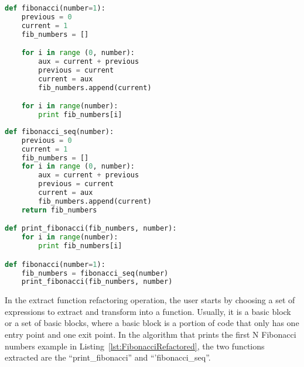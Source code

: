 



\begin{lstlisting}[frame=single, caption=Algorithm first implementation, label={lst:Fibonacci}, language=Python]
def fibonacci(number=1):
	previous = 0
	current = 1
	fib_numbers = []

	for i in range (0, number):
		aux = current + previous
		previous = current
		current = aux
		fib_numbers.append(current)

	for i in range(number):
		print fib_numbers[i]
\end{lstlisting}


\begin{lstlisting}[frame=single, caption=Algorithm after using extract function, label={lst:FibonacciRefactored}, language=Python]
def fibonacci_seq(number):
	previous = 0
	current = 1
	fib_numbers = []
	for i in range (0, number):
		aux = current + previous
		previous = current
		current = aux
		fib_numbers.append(current)
	return fib_numbers

def print_fibonacci(fib_numbers, number):
	for i in range(number):
		print fib_numbers[i]

def fibonacci(number=1):
	fib_numbers = fibonacci_seq(number)
	print_fibonacci(fib_numbers, number)
\end{lstlisting}


In the extract function refactoring operation, the user starts by choosing a set of expressions to extract and transform into a function.
Usually, it is a  basic block or a set of basic blocks, where a basic block is a portion of code that only has one entry point and one exit point.
In the algorithm that prints the first N Fibonacci numbers example in Listing~\ref{lst:FibonacciRefactored}, the two functions extracted are the ``print\_fibonacci'' and ``'fibonacci\_seq''.

